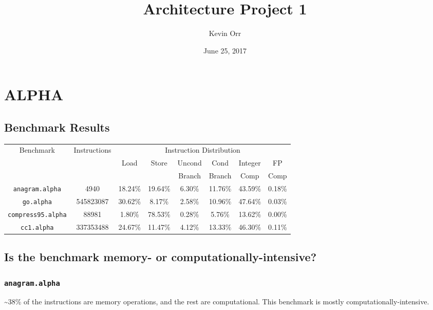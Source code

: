 \documentclass[11pt]{article}
\author{Kevin Orr}
\date{June 25, 2017}
\title{Architecture Project 1}
\begin{document}
\maketitle

\section{ALPHA}
\label{sec:org6388402}
\subsection{Benchmark Results}
\label{sec:orge4b8c79}
\begin{table}[htb]
\begin{center}
\begin{tabular}{|c|c|c|c|c|c|c|c|}
  \hline
  \multirow{3}{*}{Benchmark} & \multirow{3}{*}{Instructions} & \multicolumn{6}{c|}{Instruction Distribution} \\ \cline{3-8}
  & & \multirow{2}{*}{Load} & \multirow{2}{*}{Store} & Uncond & Cond   & Integer  & FP\\
  & &                       &                        & Branch & Branch & Comp     & Comp \\
  \hline
  \texttt{anagram.alpha} & 4940 & 18.24\% & 19.64\% & 6.30\% & 11.76\% & 43.59\% & 0.18\% \\
  \texttt{go.alpha} & 545823087 & 30.62\% & 8.17\% & 2.58\% & 10.96\% & 47.64\% & 0.03\% \\
  \texttt{compress95.alpha} & 88981 & 1.80\% & 78.53\% & 0.28\% & 5.76\% & 13.62\% & 0.00\% \\
  \texttt{cc1.alpha} & 337353488 & 24.67\% & 11.47\% & 4.12\% & 13.33\% & 46.30\% & 0.11\% \\
  \hline
\end{tabular}
\end{center}
\end{table}

\subsection{Is the benchmark memory- or computationally-intensive?}
\label{sec:orgfa77287}
\subsubsection{\texttt{anagram.alpha}}
\label{sec:org01607c4}
\textasciitilde{}38\% of the instructions are memory operations, and the rest are computational. This benchmark is mostly computationally-intensive.
\end{document}
